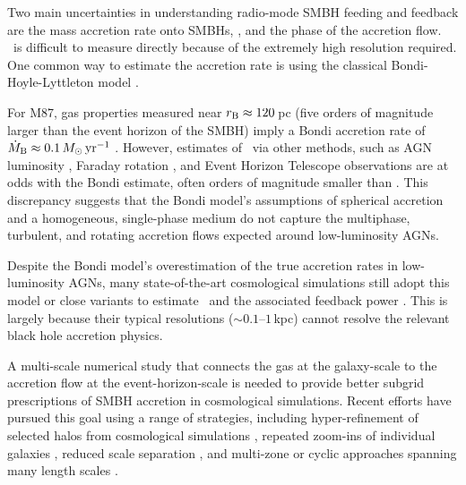 Two main uncertainties in understanding radio-mode SMBH feeding and feedback are the mass accretion rate onto SMBHs, \mdotbh, and the phase of the accretion flow. \mdotbh\ is difficult to measure directly because of the extremely high resolution required.
One common way to estimate the accretion rate is using the classical Bondi-Hoyle-Lyttleton model \citep[hereafter the ``Bondi model'',][]{hoyle_effect_1939,bondi_mechanism_1944,bondi_spherically_1952}.

For M87, gas properties measured near $r_{\rm B}\approx120$\,pc (five orders of magnitude larger than the event horizon of the SMBH) imply a Bondi accretion rate of $\dot{M}_{\rm B} \approx 0.1\, M_{\odot}\, \mathrm{yr}^{-1}$ \citep[][]{di_matteo_accretion_2003, russell_inside_2015}.
However, estimates of \mdotbh\ via other methods, such as AGN luminosity \citep[][]{broderick_event_2015}, Faraday rotation \citep[][]{kuo_measuring_2014}, and Event Horizon Telescope \citep[EHT,][]{eht_eight} observations are at odds with the Bondi estimate, often orders of magnitude smaller than \mdotb.
This discrepancy suggests that the Bondi model's assumptions of spherical accretion and a homogeneous, single-phase medium do not capture the multiphase, turbulent, and rotating accretion flows expected around low-luminosity AGNs.

Despite the Bondi model's overestimation of the true accretion rates in low-luminosity AGNs, many state-of-the-art cosmological simulations still adopt this model or close variants to estimate \mdotbh\ and the associated feedback power \citep[e.g.,][]{schaye_eagle_2015, tremmel_romulus_2017,pillepich_simulating_2018,dave_simba_2019,pakmor_millenniumtng_2023}.
This is largely because their typical resolutions ($\sim 0.1$--$1$\,kpc) cannot resolve the relevant black hole accretion physics.

A multi-scale numerical study that connects the gas at the galaxy-scale to the accretion flow at the event-horizon-scale is needed to provide better subgrid prescriptions of SMBH accretion in cosmological simulations.
Recent efforts have pursued this goal using a range of strategies, including hyper-refinement of selected halos from cosmological simulations \citep[e.g.,][]{angles-alcazar_cosmological_2021,hopkins_forged_2024,kaaz_h-amr_2025}, repeated zoom-ins of individual galaxies \citep[e.g.,][]{ressler_ab_2020,guo_toward_2023,guo_magnetized_2024}, reduced scale separation \citep[e.g.,][]{lalakos_bridging_2022}, and multi-zone or cyclic approaches spanning many length scales \citep[e.g.,][]{yuan_numerical_2012,cho_multizone_2024,guo_cyclic_2025}.

